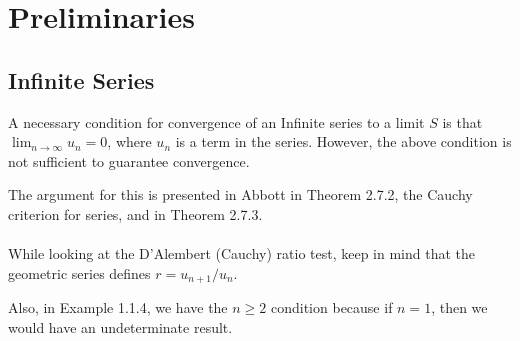 \section{Preliminaries}

\subsection{Infinite Series}

A necessary condition for convergence of an Infinite series to a limit $S$ is that
$\lim_{n\rightarrow \infty} u_n = 0$, where $u_n$ is a term in the series.
However, the above condition is not sufficient to guarantee convergence.

The argument for this is presented in Abbott in Theorem 2.7.2, the Cauchy criterion for series,
and in Theorem 2.7.3.
\\~\\

While looking at the D'Alembert (Cauchy) ratio test, keep in mind that the geometric
series defines $r = u_{n+1} / u_n$.

Also, in Example 1.1.4, we have the $n \geq 2$ condition because if $n = 1$,
then we would have an undeterminate result.
\\